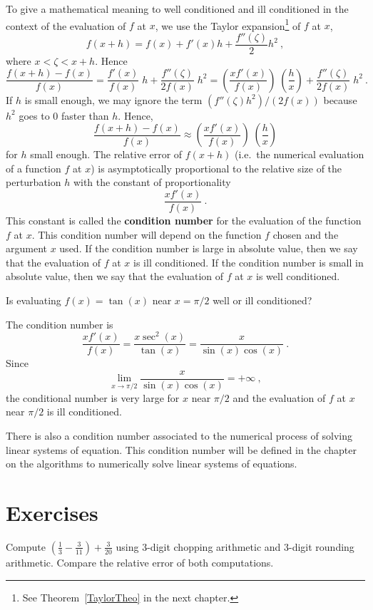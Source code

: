 To give a mathematical meaning to well conditioned and
ill conditioned in the context of the evaluation of $f$ at $x$,
we use the Taylor expansion\footnote{See Theorem~\ref{TaylorTheo} in
the next chapter.} of $f$ at $x$,
\[
f(x+h) = f(x) + f'(x)h + \frac{f''(\zeta)}{2}h^2 \ ,
\]
where $x < \zeta < x+h$.  Hence
\[
\frac{f(x+h)-f(x)}{f(x)} = \frac{f'(x)}{f(x)}\; h +
\frac{f''(\zeta)}{2f(x)}\; h^2
= \left( \frac{xf'(x)}{f(x)}\right)\; \left( \frac{h}{x} \right)
+ \frac{f''(\zeta)}{2f(x)}\; h^2 \ .
\]
If $h$ is small enough, we may ignore the term
$(f''(\zeta)h^2)/(2f(x))$ because $h^2$ goes to $0$ faster than $h$.
Hence,
\[
\frac{f(x+h)-f(x)}{f(x)} \approx
\left( \frac{xf'(x)}{f(x)}\right)\; \left( \frac{h}{x} \right)
\]
for $h$ small enough.  The relative error of $f(x+h)$ (i.e.\ the numerical
evaluation of a function $f$ at $x$) is asymptotically proportional to
the relative size of the perturbation $h$ with the constant of
proportionality
\[
\frac{xf'(x)}{f(x)} \ .
\]
This constant is called the
{\bfseries condition number} for the
evaluation of the function $f$ at $x$.  This condition number will
depend on the function $f$ chosen and the argument $x$ used.  If the
condition number is large in absolute value, then we say that the
evaluation of $f$ at $x$ is ill conditioned.  If the condition number
is small in absolute value, then we say that the evaluation of $f$ at
$x$ is well conditioned.

\begin{egg}
Is evaluating $f(x)= \tan(x)$ near $x=\pi/2$ well or ill conditioned?

The condition number is
\[
\frac{xf'(x)}{f(x)} = \frac{x\sec^2(x)}{\tan(x)} =
\frac{x}{\sin(x)\cos(x)} \ .
\]
Since
\[
\lim_{x\rightarrow \pi/2} \frac{x}{\sin(x)\cos(x)} = +\infty \ ,
\]
the conditional number is very large for $x$ near $\pi/2$ and the
evaluation of $f$ at $x$ near $\pi/2$ is ill conditioned.
\end{egg}

There is also a condition number associated to the numerical process of
solving linear systems of equation.  This condition number will be
defined in the chapter on the algorithms to numerically solve linear
systems of equations.

\section{Exercises}

\begin{question}
Compute $\displaystyle \left(\frac{1}{3}-\frac{3}{11}\right) + \frac{3}{20}$
using $3$-digit chopping arithmetic and $3$-digit rounding arithmetic.
Compare the relative error of both computations.
\label{arithQ1}
\end{question}

